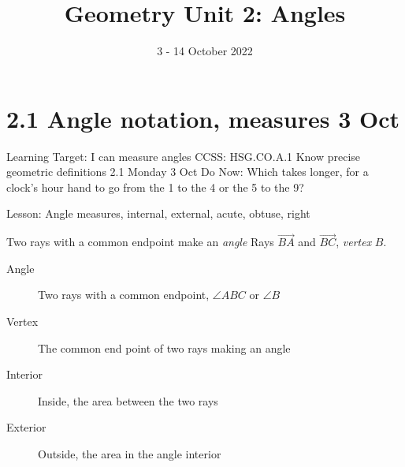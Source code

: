 

\title{Geometry Unit 2: Angles}
\date{3 - 14 October 2022}


\frame{\titlepage}

\section[Outline]{}
\frame{\tableofcontents}

\section{2.1 Angle notation, measures \hfill 3 Oct}
\begin{frame}{Learning Target: I can measure angles}
  {CCSS: HSG.CO.A.1 Know precise geometric definitions \hfill \alert{2.1 Monday 3 Oct}}
  Do Now: Which takes longer, for a clock's hour hand to go from the 1 to the 4 or the 5 to the 9? \par \bigskip
     \par \bigskip
  Lesson: Angle measures, internal, external, acute, obtuse, right
\end{frame}

\begin{frame}{Two rays with a common endpoint make an \emph{angle}}
  Rays $\overrightarrow{BA}$ and $\overrightarrow{BC}$, \emph{vertex} $B$. \par \bigskip
    \begin{description}
      \item[Angle] Two rays with a common endpoint, $\angle ABC$ or $\angle B$
      \item[Vertex] The common end point of two rays making an angle
      \item[Interior] Inside, the area between the two rays
      \item[Exterior] Outside, the area in the angle interior 
    \end{description}
  \end{frame}

